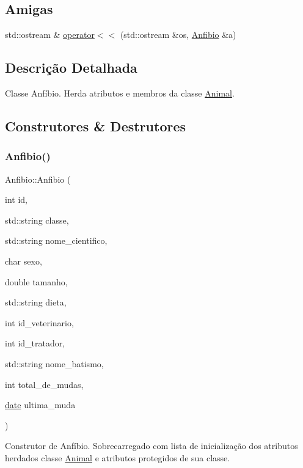 \subsection*{Amigas}
\begin{DoxyCompactItemize}
\item 
std\+::ostream \& \hyperlink{classAnfibio_a0c4cab2951e6110fd77ba060a8defb7c}{operator$<$$<$} (std\+::ostream \&os, \hyperlink{classAnfibio}{Anfibio} \&a)
\end{DoxyCompactItemize}


\subsection{Descrição Detalhada}
Classe Anfíbio. Herda atributos e membros da classe \hyperlink{classAnimal}{Animal}. 

\subsection{Construtores \& Destrutores}
\mbox{\label{classAnfibio_abe236bbadbcf7d23944f1586aa9ad315}} 
\subsubsection{\texorpdfstring{Anfibio()}{Anfibio()}}
{\footnotesize\ttfamily Anfibio\+::\+Anfibio (\begin{DoxyParamCaption}\item[{int}]{id,  }\item[{std\+::string}]{classe,  }\item[{std\+::string}]{nome\+\_\+cientifico,  }\item[{char}]{sexo,  }\item[{double}]{tamanho,  }\item[{std\+::string}]{dieta,  }\item[{int}]{id\+\_\+veterinario,  }\item[{int}]{id\+\_\+tratador,  }\item[{std\+::string}]{nome\+\_\+batismo,  }\item[{int}]{total\+\_\+de\+\_\+mudas,  }\item[{\hyperlink{classdate}{date}}]{ultima\+\_\+muda }\end{DoxyParamCaption})}

Construtor de Anfíbio. Sobrecarregado com lista de inicialização dos atributos herdados classe \hyperlink{classAnimal}{Animal} e atributos protegidos de sua classe. \mbox{\label{classAnfibio_a53bb71a1ed0e79c5fc41a62a0af9060c}} 
